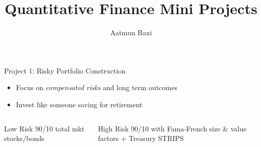 \documentclass[presentation]{beamer}
\institute{2025 Summer Erdos Institute}
\author{Aatmun Baxi}
\date{}
\title{Quantitative Finance Mini Projects}
\begin{document}
\maketitle
\begin{frame}[label={sec:orge0092b0}]{Project 1: Risky Portfolio Construction}
\begin{itemize}
\item Focus on \emph{compensated risks} and long term outcomes
\item Invest like someone saving for retirement
\end{itemize}
\pause
\begin{columns}
\begin{column}{0.4\columnwidth}
\begin{block}{Low Risk}
90/10 total mkt stocks/bonds
\pause
\end{block}
\end{column}
\begin{column}{0.6\columnwidth}
\begin{block}{High Risk}
90/10 with Fama-French size \& value factors + Treasury STRIPS
\end{block}
\end{column}
\end{columns}
\end{frame}
\end{document}
